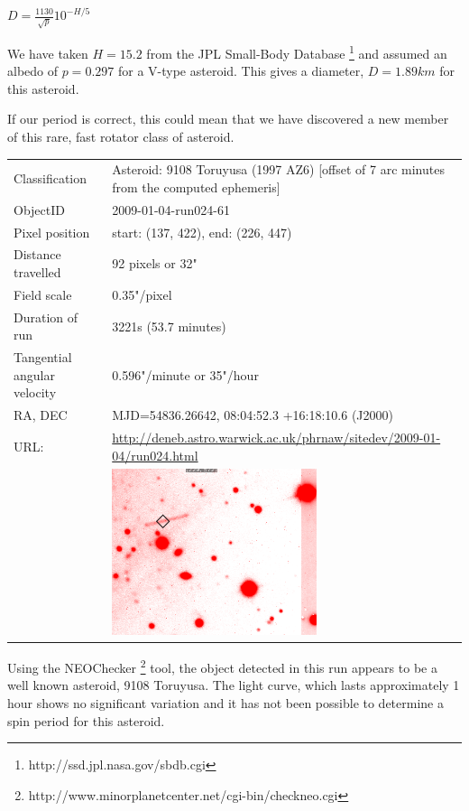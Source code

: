   $D = \frac{1130}{\sqrt{p}}10^{-H/5} $

  We have taken $H = 15.2$ from the JPL Small-Body Database \footnote{http://ssd.jpl.nasa.gov/sbdb.cgi} and assumed an albedo of $ p = 0.297$ for a V-type asteroid. This gives a diameter, $D = 1.89 km$ for this asteroid. 

  If our period is correct, this could mean that we have discovered a new member of this rare, fast rotator class of asteroid. 


  \newpage
  \begin{tabular}{l l}
  Classification & Asteroid: 9108 Toruyusa (1997 AZ6) [offset of 7 arc minutes from the computed ephemeris]\\
  ObjectID & 2009-01-04-run024-61 \\
  Pixel position & start: (137, 422), end: (226, 447) \\
  Distance travelled & 92 pixels or 32" \\
  Field scale & 0.35"/pixel \\
  Duration of run & 3221s (53.7 minutes) \\
  Tangential angular velocity & 0.596"/minute or 35"/hour\\ 
  RA, DEC & MJD=54836.26642, 08:04:52.3 +16:18:10.6 (J2000) \\
  URL: & \small \url{http://deneb.astro.warwick.ac.uk/phrnaw/sitedev/2009-01-04/run024.html} \\
       & \includegraphics[width=60mm]{images/2009-01-04-run024-61.png} \\
  \end{tabular}

  Using the NEOChecker \footnote{http://www.minorplanetcenter.net/cgi-bin/checkneo.cgi} tool, the object detected in this run appears to be a well known asteroid, 9108 Toruyusa. The light curve, which lasts approximately 1 hour shows no significant variation and it has not been possible to determine a spin period for this asteroid.  

  
